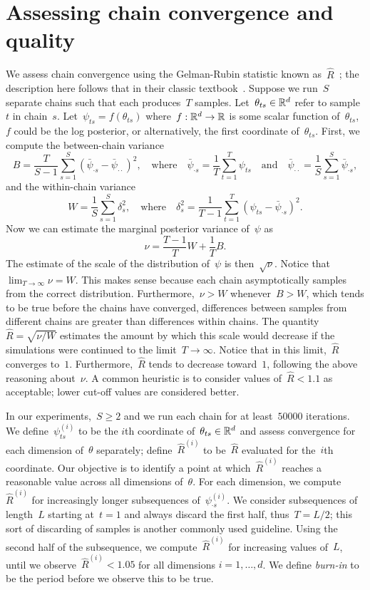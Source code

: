\documentclass[angelino.tex]{subfiles}
\begin{document}
\section{Assessing chain convergence and quality}
\label{sec:convergence}

We assess chain convergence using the Gelman-Rubin statistic 
known as~$\hat{R}$~\citep{gelman:1992-inference};
the description here follows that in their classic textbook~\citep{gelman:1993-bda}.
Suppose we run~$S$ separate chains such that each produces~$T$ samples.
Let~${\theta_{ts} \in \mathbb{R}^d}$ refer to sample~$t$ in chain~$s$.
Let~${\psi_{ts} = f(\theta_{ts})}$ where~${f: \mathbb{R}^d \rightarrow \mathbb{R}}$ 
is some scalar function of~$\theta_{ts}$, \eg $f$ could be the log posterior,
or alternatively, the first coordinate of~$\theta_{ts}$.
First, we compute the between-chain variance
\[
B = \frac{T}{S-1} \sum_{s=1}^S (\bar{\psi}_{\cdot s} - \bar{\psi}_{\cdot \cdot})^2,
\quad \text{where} \quad
\bar{\psi}_{\cdot s} = \frac{1}{T} \sum_{t=1}^T \psi_{ts} \quad \mbox{and} \quad
\bar{\psi}_{\cdot \cdot} = \frac{1}{S} \sum_{s=1}^S \bar{\psi}_{\cdot s},
\]
and the within-chain variance
\[
W = \frac{1}{S} \sum_{s=1}^S \delta_s^2, \quad \mbox{where} \quad
\delta_s^2 = \frac{1}{T-1} \sum_{t=1}^T (\psi_{ts} - \bar{\psi}_{\cdot s})^2.
\]
Now we can estimate the marginal posterior variance of~$\psi$ as
\[
\nu = \frac{T-1}{T} W + \frac{1}{T} B.
\]
The estimate of the scale of the distribution of~$\psi$ is then~$\sqrt{\nu}$.
Notice that~${\lim_{T \rightarrow \infty} \nu = W}$.
This makes sense because each chain asymptotically samples from the correct
distribution.
Furthermore,~${\nu > W}$ whenever~${B > W}$, which tends to be true before the
chains have converged, \ie differences between samples from different chains are
greater than differences within chains.
The quantity~${\hat{R} = \sqrt{\nu/W}}$ estimates the amount by which this scale
would decrease if the simulations were continued to the limit~$T \rightarrow \infty$.
Notice that in this limit,~$\hat{R}$ converges to~$1$.
Furthermore,~$\hat{R}$ tends to decrease toward~$1$, following the above
reasoning about~$\nu$.
A common heuristic is to consider values of~$\hat{R} < 1.1$ as acceptable;
lower cut-off values are considered better.

In our experiments,~$S \ge 2$ and we run each chain for at least~$50000$ iterations.
We define~$\psi^{(i)}_{ts}$ to be the $i$th coordinate of~${\theta_{ts} \in \mathbb{R}^d}$
and assess convergence for each dimension of~$\theta$ separately;
define~$\hat{R}^{(i)}$ to be~$\hat{R}$ evaluated for the~$i$th coordinate.
Our objective is to identify a point at which~$\hat{R}^{(i)}$ reaches a
reasonable value across all dimensions of~$\theta$.
For each dimension, we compute~$\hat{R}^{(i)}$ for increasingly longer
subsequences of~$\psi^{(i)}_{\cdot s}$.
We consider subsequences of length~$L$ starting at~${t=1}$
and always discard the first half, thus~${T = L/2}$;
this sort of discarding of samples is another commonly used guideline.
Using the second half of the subsequence,
we compute~$\hat{R}^{(i)}$ for increasing values of~$L$,
until we observe~${\hat{R}^{(i)} < 1.05}$ for all dimensions ${i = 1, \dots, d}$.
We define \emph{burn-in} to be the period before we observe this to be true.
\end{document}
